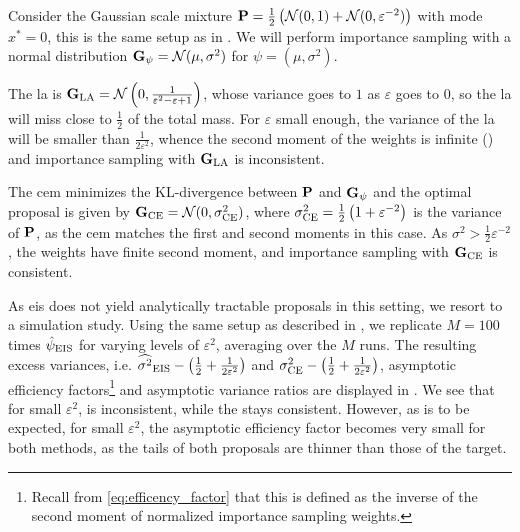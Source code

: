 \begin{example}
  \label{ex:la_failure}
  Consider the Gaussian scale mixture $\P = \frac{1}{2} \left(\mathcal N (0,1) + \mathcal N(0, \varepsilon^{-2})\right)$ with mode $x^{\ast}=0$, this is the same setup as in . We will perform importance sampling with a normal distribution $\G_{\psi} = \mathcal N (\mu, \sigma^{2})$ for $\psi = \left( \mu, \sigma^{2} \right)$.

  The \gls{la} is $\G_{\text{LA}} = \mathcal N \left( 0, \frac{1}{\varepsilon^{2} - \varepsilon + 1} \right)$, whose variance goes to $1$ as $\varepsilon$ goes to $0$, so the \gls{la} will miss close to $\frac 1 2$ of the total mass.
  For $\varepsilon$ small enough, the variance of the \gls{la} will be smaller than $\frac{1}{2\varepsilon^{2}}$, whence the second moment of the weights is infinite () and importance sampling with $\G_{\text{LA}}$ is inconsistent.

  The \gls{cem} minimizes the KL-divergence between $\P$ and $\G_{\psi}$ and the optimal proposal is given by $\G_{\text{CE}} = \mathcal N (0, \sigma_{\ce}^{2})$, where $\sigma_{\ce}^{2} = \frac{1}{2}\left( 1 + \varepsilon^{-2} \right)$ is the variance of $\P$, as the \gls{cem} matches the first and second moments in this case.
  As $\sigma^{2} > \frac{1}{2}\varepsilon^{-2}$, the weights have finite second moment, and importance sampling with $\G_{\ce}$ is consistent.

  As \Gls{eis} does not yield analytically tractable proposals in this setting, we resort to a simulation study. Using the same setup as described in , we replicate $M = 100$ times $\hpeis$ for varying levels of $\varepsilon^{2}$, averaging over the $M$ runs. The resulting excess variances, i.e. $\widehat{\sigma^{2}}_{\eis} - \left( \frac{1}{2} + \frac{1}{2 \varepsilon^{2}} \right)$ and $\sigma^{2}_{\ce} - \left( \frac{1}{2} + \frac{1}{2 \varepsilon^{2}} \right)$, asymptotic efficiency factors\footnote{Recall from \eqref{eq:efficency_factor} that this is defined as the inverse of the second moment of normalized importance sampling weights.} and asymptotic variance ratios are displayed in . We see that for small $\varepsilon^{2}$, \aeis is inconsistent, while the \acem stays consistent. However, as is to be expected, for small $\varepsilon^{2}$, the asymptotic efficiency factor becomes very small for both methods, as the tails of both proposals are thinner than those of the target.


\end{example}
